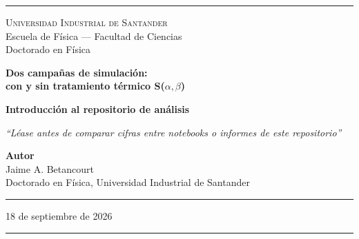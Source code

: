 \documentclass[11pt,a4paper]{article}
\begin{document}
\pagestyle{empty}


\begin{titlepage}
\begin{center}

\vspace*{0.5cm}
\textcolor{reglaColor}{\rule{\linewidth}{1.2pt}}

\vspace{1.3cm}
{\Large\scshape Universidad Industrial de Santander}\\[0.2cm]
{\large Escuela de Física --- Facultad de Ciencias}\\[0.2cm]
{\large Doctorado en Física}

\vspace{2.2cm}
{\Huge\bfseries\color{tituloColor} Dos campañas de simulación:\\[0.2cm]
con y sin tratamiento térmico S($\alpha,\beta$)}

\vspace{1.8cm}
{\large\textbf{Introducción al repositorio de análisis}}

\vspace{0.6cm}
\begin{minipage}{0.82\linewidth}
\centering
\textit{``Léase antes de comparar cifras entre notebooks o informes de este repositorio''}
\end{minipage}

\vfill

{\large\textbf{Autor}}\\[0.15cm]
Jaime A. Betancourt\\[0.1cm]
Doctorado en Física, Universidad Industrial de Santander

\vspace{1.2cm}
\textcolor{reglaColor}{\rule{0.5\linewidth}{0.6pt}}

\vspace{1cm}
18 de septiembre de 2026

\vspace{1cm}
\textcolor{reglaColor}{\rule{\linewidth}{1.2pt}}

\end{center}
\end{titlepage}

\pagestyle{plain}
\end{document}
